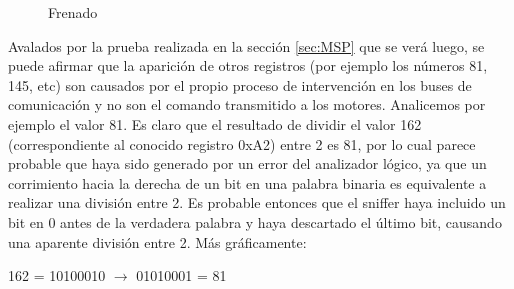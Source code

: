 \documentclass[main]{subfiles}
\begin{document}
\begin{figure} [h!]
\centering
  \caption{Frenado}
  \label{fig:frenado}
\end{figure}

Avalados por la prueba realizada en la secci\'on \ref{sec:MSP} que se ver\'a luego, se puede afirmar que la aparici\'on de otros registros (por ejemplo los n\'umeros 81, 145, etc) son causados por el propio proceso de intervención en los buses de comunicación y no son el comando transmitido a los motores. Analicemos por ejemplo el valor 81. Es claro que el resultado de dividir el valor 162 (correspondiente al conocido registro 0xA2) entre 2 es 81, por lo cual parece probable que haya sido generado por un error del analizador lógico, ya que un corrimiento hacia la derecha de un bit en una palabra binaria es equivalente a realizar una divisi\'on entre 2. Es probable entonces que el sniffer haya incluido un bit en 0 antes de la verdadera palabra y haya descartado el \'ultimo bit, causando una aparente divisi\'on entre 2. M\'as gr\'aficamente:\\

\begin{center} 162 = 10100010 $\rightarrow$ \color{green}0\color{black}1010001\color{red}\color{black} = 81\\
\end{center}
\end{document}
